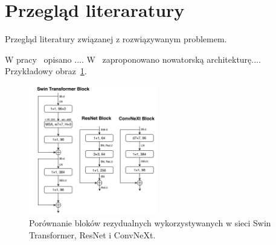 \newpage %
\section{Przegląd literaratury}

Przegląd literatury związanej z rozwiązywanym problemem. 

W pracy~\cite{he2016deep} opisano ....
W~\cite{liu2022convnet} zaproponowano nowatorską architekturę....
Przykładowy obraz~\ref{fig:convnext}.

\begin{figure}[h]
    \centering
    \includegraphics[width=0.5\textwidth]{rysunki/convnext_block.png}
    \caption{Porównanie bloków rezydualnych wykorzystywanych w sieci Swin Transformer, ResNet i ConvNeXt.}
    \label{fig:convnext}
\end{figure}

